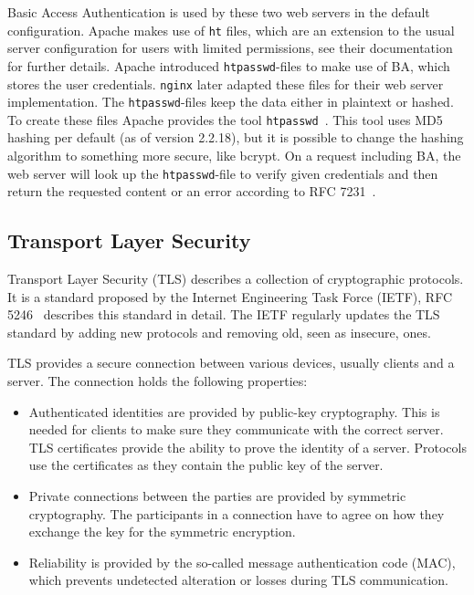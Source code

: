 Basic Access Authentication is used by these two web servers in the default
configuration. Apache makes use of \texttt{ht} files, which are an extension to
the usual server configuration for users with limited permissions, see
their documentation~\cite{apacheauthdoc} for further details. Apache introduced
\texttt{htpasswd}-files to make use of BA, which stores the user credentials.
\texttt{nginx} later adapted these files for their web server implementation.
The \texttt{htpasswd}-files keep the data either in plaintext or hashed. To
create these files Apache provides the tool
\texttt{htpasswd}~\cite{htpasswddoc}. This tool uses MD5 hashing per default (as
of version 2.2.18), but it is possible to change the hashing algorithm to
something more secure, like bcrypt. On a request including BA, the web server
will look up the \texttt{htpasswd}-file to verify given credentials and then
return the requested content or an error according to RFC 7231~\cite{rfc7231}.

\subsection{Transport Layer Security}

Transport Layer Security (TLS) describes a collection of cryptographic
protocols. It is a standard proposed by the Internet Engineering Task Force
(IETF), RFC 5246~\cite{rfc5246} describes this standard in detail. The IETF
regularly updates the TLS standard by adding new protocols and removing old,
seen as insecure, ones.

TLS provides a secure connection between various devices, usually clients and a
server. The connection holds the following properties:
\begin{itemize}
  \item Authenticated identities are provided by public-key cryptography. This
is needed for clients to make sure they communicate with the correct server. TLS
certificates provide the ability to prove the identity of a server. Protocols
use the certificates as they contain the public key of the server.
  \item Private connections between the parties are provided by symmetric
cryptography. The participants in a connection have to agree on how they
exchange the key for the symmetric encryption.
  \item Reliability is provided by the so-called message authentication code
(MAC), which prevents undetected alteration or losses during TLS communication.
\end{itemize}

